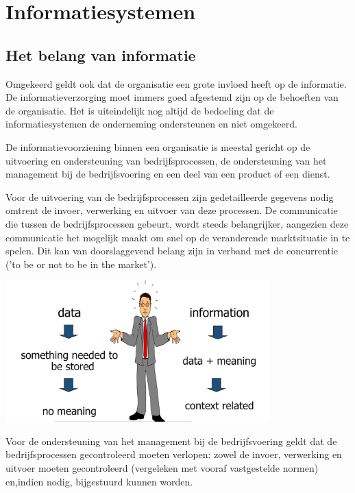 \section{Informatiesystemen}

\subsection{Het belang van informatie}
Omgekeerd geldt ook dat de organisatie een grote invloed heeft op de informatie. De informatieverzorging moet immers goed afgestemd zijn op de behoeften van de organisatie. Het is uiteindelijk nog altijd de bedoeling dat de informatiesystemen de onderneming ondersteunen en niet omgekeerd.

De informatievoorziening binnen een organisatie is meestal gericht op de uitvoering en ondersteuning van bedrijfsprocessen, de ondersteuning van het management bij de bedrijfsvoering en een deel van een product of een dienst.

Voor de uitvoering van de bedrijfsprocessen zijn gedetailleerde gegevens nodig omtrent de invoer, verwerking en uitvoer van deze processen. De communicatie die tussen de bedrijfsprocessen gebeurt, wordt steeds belangrijker, aangezien deze communicatie het mogelijk maakt om snel op de veranderende marktsituatie in te spelen. Dit kan van doorslaggevend belang zijn in verband met de concurrentie ('to be or not to be in the market').

\begin{center}
\includegraphics[width=4in]{img/theimportanceofinformation}%
\label{The importance of information}%
\end{center}

Voor de ondersteuning van het management bij de bedrijfsvoering geldt dat de bedrijfsprocessen gecontroleerd moeten verlopen: zowel de invoer, verwerking en uitvoer moeten gecontroleerd (vergeleken met vooraf vastgestelde normen) en,indien nodig, bijgestuurd kunnen worden.

